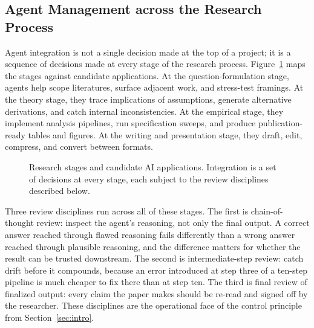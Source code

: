 \documentclass[11pt]{article}
\begin{document}
\subsection{Agent Management across the Research Process}
\label{sec:deploy-agents}

Agent integration is not a single decision made at the top of a project; it is a sequence of decisions made at every stage of the research process. Figure~\ref{fig:stages} maps the stages against candidate applications. At the question-formulation stage, agents help scope literatures, surface adjacent work, and stress-test framings. At the theory stage, they trace implications of assumptions, generate alternative derivations, and catch internal inconsistencies. At the empirical stage, they implement analysis pipelines, run specification sweeps, and produce publication-ready tables and figures. At the writing and presentation stage, they draft, edit, compress, and convert between formats.

\begin{figure}[t]
  \centering
  \caption{Research stages and candidate AI applications. Integration is a set of decisions at every stage, each subject to the review disciplines described below.}
  \label{fig:stages}
\end{figure}

Three review disciplines run across all of these stages. The first is chain-of-thought review: inspect the agent's reasoning, not only the final output. A correct answer reached through flawed reasoning fails differently than a wrong answer reached through plausible reasoning, and the difference matters for whether the result can be trusted downstream. The second is intermediate-step review: catch drift before it compounds, because an error introduced at step three of a ten-step pipeline is much cheaper to fix there than at step ten. The third is final review of finalized output: every claim the paper makes should be re-read and signed off by the researcher. These disciplines are the operational face of the control principle from Section~\ref{sec:intro}.
\end{document}
